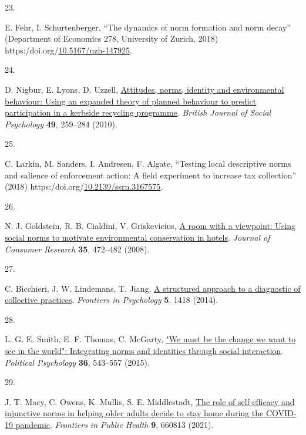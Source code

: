 \documentclass[
  man,floatsintext]{apa6}
\newlength{\cslhangindent}
\newlength{\csllabelwidth}
\newlength{\cslentryspacingunit} %
\newenvironment{CSLReferences}[2] %
 {%
  \setlength{\parindent}{0pt}
  \ifodd #1
  \let\oldpar\par
  \def\par{\hangindent=\cslhangindent\oldpar}
  \fi
  \setlength{\parskip}{#2\cslentryspacingunit}
 }%
 {}
\newcommand{\CSLLeftMargin}[1]{\parbox[t]{\csllabelwidth}{#1}}
\newcommand{\CSLRightInline}[1]{\parbox[t]{\linewidth - \csllabelwidth}{#1}\break}
\begin{document}
\begin{CSLReferences}{0}{0}
\leavevmode{}%
\CSLLeftMargin{23. }%
\CSLRightInline{E. Fehr, I. Schurtenberger, {``The dynamics of norm formation and norm decay''} (Department of Economics 278, University of Zurich, 2018) https:/doi.org/\href{https://doi.org/10.5167/uzh-147925}{10.5167/uzh-147925}.}

\leavevmode{}%
\CSLLeftMargin{24. }%
\CSLRightInline{D. Nigbur, E. Lyons, D. Uzzell, \href{https://doi.org/10.1348/014466609X449395}{Attitudes, norms, identity and environmental behaviour: Using an expanded theory of planned behaviour to predict participation in a kerbside recycling programme}. \emph{British Journal of Social Psychology} \textbf{49}, 259--284 (2010).}

\leavevmode{}%
\CSLLeftMargin{25. }%
\CSLRightInline{C. Larkin, M. Sanders, I. Andresen, F. Algate, {``Testing local descriptive norms and salience of enforcement action: A field experiment to increase tax collection''} (2018) https:/doi.org/\href{https://doi.org/10.2139/ssrn.3167575}{10.2139/ssrn.3167575}.}

\leavevmode{}%
\CSLLeftMargin{26. }%
\CSLRightInline{N. J. Goldstein, R. B. Cialdini, V. Griskevicius, \href{https://doi.org/10.1086/586910}{A room with a viewpoint: Using social norms to motivate environmental conservation in hotels}. \emph{Journal of Consumer Research} \textbf{35}, 472--482 (2008).}

\leavevmode{}%
\CSLLeftMargin{27. }%
\CSLRightInline{C. Bicchieri, J. W. Lindemans, T. Jiang, \href{https://doi.org/10.3389/fpsyg.2014.01418}{A structured approach to a diagnostic of collective practices}. \emph{Frontiers in Psychology} \textbf{5}, 1418 (2014).}

\leavevmode{}%
\CSLLeftMargin{28. }%
\CSLRightInline{L. G. E. Smith, E. F. Thomas, C. McGarty, \href{https://doi.org/10.1111/pops.12180}{"We must be the change we want to see in the world": Integrating norms and identities through social interaction}. \emph{Political Psychology} \textbf{36}, 543--557 (2015).}

\leavevmode{}%
\CSLLeftMargin{29. }%
\CSLRightInline{J. T. Macy, C. Owens, K. Mullis, S. E. Middlestadt, \href{https://doi.org/10.3389/fpubh.2021.660813}{The role of self-efficacy and injunctive norms in helping older adults decide to stay home during the {COVID-19} pandemic}. \emph{Frontiers in Public Health} \textbf{9}, 660813 (2021).}


\end{CSLReferences}
\end{document}
